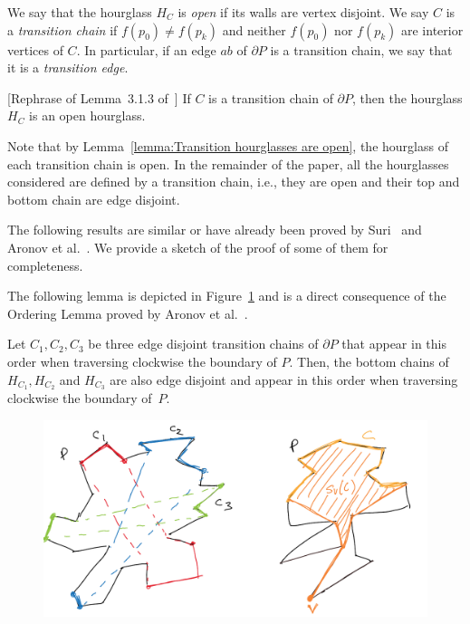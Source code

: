 \documentclass[a4paper,UKenglish]{lipics}
\newcommand{\ff}[1]{\ensuremath{f(#1)}}
\begin{document}
We say that the hourglass $H_C$ is \emph{open} if its walls are vertex disjoint. 
We say $C$ is a \emph{transition chain} if $\ff{p_0} \neq \ff{p_k}$ and neither $\ff{p_0}$ nor $\ff{p_k}$ are interior vertices of $C$. 
In particular, if an edge $ab$ of $\partial P$ is a transition chain, we say that it is a \emph{transition edge}.

\begin{lemma}\label{lemma:Transition hourglasses are open}
[Rephrase of Lemma~3.1.3 of~\cite{aronov1993furthest}] 
If $C$ is a transition chain of $\partial P$, then the hourglass $H_C$ is an open hourglass.
\end{lemma}

Note that by Lemma~\ref{lemma:Transition hourglasses are open}, the hourglass of each transition chain is open.
In the remainder of the paper, all the hourglasses considered are defined by a transition chain, i.e., they are open and their top and bottom chain are edge disjoint.

The following results are similar or have already been proved by Suri~\cite{suri1989computing} and Aronov et al.~\cite{aronov1993furthest}. We provide a sketch of the proof of some of them for completeness.

The following lemma is depicted in Figure~\ref{fig:Order Lemma And Funnels} and is a direct consequence of the Ordering Lemma proved by Aronov et al.~\cite[Corollary 2.7.4]{aronov1993furthest}.
\begin{lemma}\label{lemma:Ordering Lemma}
Let $C_1, C_2, C_3$ be three edge disjoint transition chains of $\partial P$ that appear in this order when traversing clockwise the boundary of $P$. Then, the bottom chains of $H_{C_1}, H_{C_2}$ and $H_{C_3}$ are also edge disjoint and appear in this order when traversing clockwise the boundary of~$P$.
\end{lemma}

\begin{figure}[tb]
\centering
\includegraphics[width=1\textwidth]{img/OrderAndFunnel.pdf}
\caption{\small }
\label{fig:Order Lemma And Funnels}
\end{figure}
\end{document}

